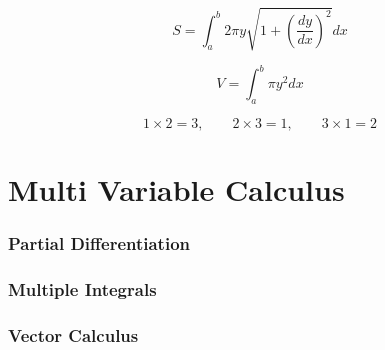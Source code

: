 \documentclass[]{article}
\begin{document}
\begin{equation*}
    S = \int_{a}^{b} 2 \pi y \sqrt{1 + \left(\frac{dy}{dx}\right)^{2}}dx
\end{equation*}

\begin{equation*}
    V = \int_{a}^{b} \pi y^{2} dx
\end{equation*}

\[ 1 \times  2 = 3,\qquad 2\times 3 = 1, \qquad 3\times 1 = 2\]

\part{Multi Variable Calculus}
\section{Partial Differentiation}
\section{Multiple Integrals}
\section{Vector Calculus}
\end{document}

